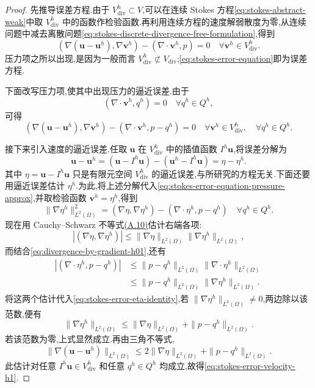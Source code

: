 \begin{proof}
先推导误差方程.由于 $V_{\mathrm{div}}^h\subset V$,可以在连续 Stokes 方程\cref{eq:stokes-abstract-weak}中取 $V_{\mathrm{div}}^h$ 中的函数作检验函数.再利用连续方程的速度解弱散度为零,从连续问题中减去离散问题\cref{eq:stokes-discrete-divergence-free-formulation},得到
\begin{equation}\label{eq:stokes-error-equation}
  (\nabla(\bm{u}-\bm{u}^h),\nabla\bm{v}^h)
      -(\nabla\cdot\bm{v}^h,p)=0
      \quad\forall\bm{v}^h\in V_{\mathrm{div}}^h.
\end{equation}
压力项之所以出现,是因为一般而言 $V_{\mathrm{div}}^h\not\subset V_{\mathrm{div}}$;\cref{eq:stokes-error-equation}即为误差方程.

下面改写压力项,使其中出现压力的逼近误差.由于
\[
  (\nabla\cdot\bm{v}^h,q^h)=0
  \quad\forall q^h\in Q^h,
\]
可得
\begin{equation}\label{eq:stokes-error-equation-pressure-approx}
  (\nabla(\bm{u}-\bm{u}^h),\nabla\bm{v}^h)
     -(\nabla\cdot\bm{v}^h,p-q^h)=0
  \quad\forall\bm{v}^h\in V_{\mathrm{div}}^h,
       \quad\forall q^h\in Q^h.
\end{equation}

接下来引入速度的逼近误差.任取 $\bm{u}$ 在 $V_{\mathrm{div}}^h$ 中的插值函数 $I^h\bm{u}$,将误差分解为
\[
  \bm{u}-\bm{u}^h
   =(\bm{u}-I^h\bm{u})
      -(\bm{u}^h-I^h\bm{u})
   =\eta-\eta^h.
\]
其中 $\eta=\bm{u}-I^h\bm{u}$ 只是有限元空间 $V_{\mathrm{div}}^h$ 的逼近误差,与所研究的方程无关.下面还要用逼近误差估计 $\eta^h$.为此,将上述分解代入\cref{eq:stokes-error-equation-pressure-approx},并取检验函数 $\bm{v}^h=\eta^h$,得到
\begin{equation}\label{eq:stokes-error-eta-identity}
  \|\nabla\eta^h\|_{L^2(\Omega)}^2
   =(\nabla\eta,\nabla\eta^h)
      -(\nabla\cdot\eta^h,p-q^h)
      \quad\forall q^h\in Q^h.
\end{equation}
现在用 Cauchy--Schwarz 不等式\hyperref[eq:appendix-a-10]{(A.10)}估计右端各项:
\[
\left|(\nabla\eta,\nabla\eta^h)\right|
   \leq\|\nabla\eta\|_{L^2(\Omega)}
         \|\nabla\eta^h\|_{L^2(\Omega)},
\]
而结合\cref{eq:divergence-by-gradient-h01},还有
\begin{equation}\label{eq:stokes-error-eta-pressure-bound}
\begin{aligned}
  \left|(\nabla\cdot\eta^h,p-q^h)\right|
   &\leq\|p-q^h\|_{L^2(\Omega)}
          \|\nabla\cdot\eta^h\|_{L^2(\Omega)}\\
   &\leq\|p-q^h\|_{L^2(\Omega)}
          \|\nabla\eta^h\|_{L^2(\Omega)}.
\end{aligned}
\end{equation}
将这两个估计代入\cref{eq:stokes-error-eta-identity},若 $\|\nabla\eta^h\|_{L^2(\Omega)}\ne0$,两边除以该范数,便有
\[
  \|\nabla\eta^h\|_{L^2(\Omega)}
    \leq\|\nabla\eta\|_{L^2(\Omega)}
         +\|p-q^h\|_{L^2(\Omega)}.
\]
若该范数为零,上式显然成立.再由三角不等式,
\[
  \|\nabla(\bm{u}-\bm{u}^h)\|_{L^2(\Omega)}
    \leq2\|\nabla\eta\|_{L^2(\Omega)}
       +\|p-q^h\|_{L^2(\Omega)}.
\]
此估计对任意 $I^h\bm{u}\in V_{\mathrm{div}}^h$ 和任意 $q^h\in Q^h$ 均成立,故得\cref{eq:stokes-error-velocity-h1}.
\end{proof}

